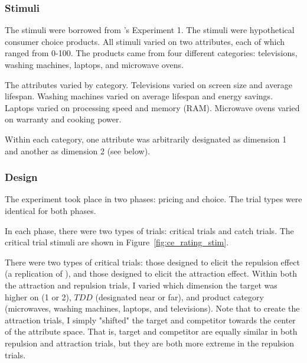 \subsubsection{Stimuli}

The stimuli were borrowed from \textcite{banerjeeFactorsThatPromote2024}'s Experiment 1. The stimuli were hypothetical consumer choice products. All stimuli varied on two attributes, each of which ranged from 0-100. The products came from four different categories: televisions, washing machines, laptops, and microwave ovens. 

The attributes varied by category. Televisions varied on screen size and average lifespan. Washing machines varied on average lifespan and energy savings. Laptops varied on processing speed and memory (RAM). Microwave ovens varied on warranty and cooking power. 

Within each category, one attribute was arbitrarily designated as dimension 1 and another as dimension 2 (see below). 

\subsubsection{Design}

The experiment took place in two phases: pricing and choice. The trial types were identical for both phases.

In each phase, there were two types of trials: critical trials and catch trials. The critical trial stimuli are shown in Figure~\ref{fig:ce_rating_stim}. 

There were two types of critical trials: those designed to elicit the repulsion effect (a replication of \citeauthor{banerjeeFactorsThatPromote2024}), and those designed to elicit the attraction effect. Within both the attraction and repulsion trials, I varied which dimension the target was higher on (1 or 2), $TDD$ (designated near or far), and product category (microwaves, washing machines, laptops, and televisions). Note that to create the attraction trials, I simply "shifted" the target and competitor towards the center of the attribute space. That is, target and competitor are equally similar in both repulsion and attraction trials, but they are both more extreme in the repulsion trials.

